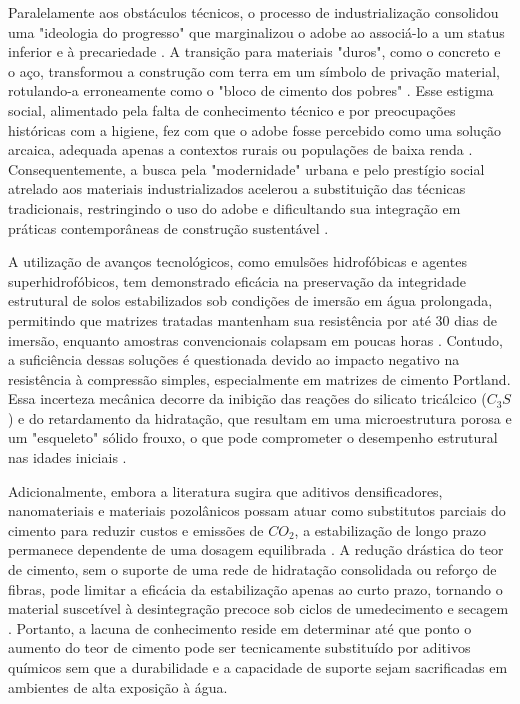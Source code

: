 Paralelamente aos obstáculos técnicos, o processo de industrialização consolidou uma "ideologia do progresso" que marginalizou o adobe ao associá-lo a um status inferior e à precariedade \cite{Aspillaga2024, Morel2021, Novato2019}. A transição para materiais "duros", como o concreto e o aço, transformou a construção com terra em um símbolo de privação material, rotulando-a erroneamente como o "bloco de cimento dos pobres" \cite{Zoungrana2021}. Esse estigma social, alimentado pela falta de conhecimento técnico e por preocupações históricas com a higiene, fez com que o adobe fosse percebido como uma solução arcaica, adequada apenas a contextos rurais ou populações de baixa renda \cite{Soler2021, Novato2019, Morel2021, Aspillaga2024}. Consequentemente, a busca pela "modernidade" urbana e pelo prestígio social atrelado aos materiais industrializados acelerou a substituição das técnicas tradicionais, restringindo o uso do adobe e dificultando sua integração em práticas contemporâneas de construção sustentável \cite{Zoungrana2021}.


A utilização de avanços tecnológicos, como emulsões hidrofóbicas e agentes superhidrofóbicos, tem demonstrado eficácia na preservação da integridade estrutural de solos estabilizados sob condições de imersão em água prolongada, permitindo que matrizes tratadas mantenham sua resistência por até 30 dias de imersão, enquanto amostras convencionais colapsam em poucas horas \cite{Guo2025}. Contudo, a suficiência dessas soluções é questionada devido ao impacto negativo na resistência à compressão simples, especialmente em matrizes de cimento Portland. Essa incerteza mecânica decorre da inibição das reações do silicato tricálcico ($C_3S$) e do retardamento da hidratação, que resultam em uma microestrutura porosa e um "esqueleto" sólido frouxo, o que pode comprometer o desempenho estrutural nas idades iniciais \cite{Lu2023, Luo2023, Jahandari2023}.

Adicionalmente, embora a literatura sugira que aditivos densificadores, nanomateriais e materiais pozolânicos possam atuar como substitutos parciais do cimento para reduzir custos e emissões de $CO_2$, a estabilização de longo prazo permanece dependente de uma dosagem equilibrada \cite{Zhang2025, Jahandari2023, Dormohamadi2024, Wahabi2021}. A redução drástica do teor de cimento, sem o suporte de uma rede de hidratação consolidada ou reforço de fibras, pode limitar a eficácia da estabilização apenas ao curto prazo, tornando o material suscetível à desintegração precoce sob ciclos de umedecimento e secagem \cite{Wahabi2021}. Portanto, a lacuna de conhecimento reside em determinar até que ponto o aumento do teor de cimento pode ser tecnicamente substituído por aditivos químicos sem que a durabilidade e a capacidade de suporte sejam sacrificadas em ambientes de alta exposição à água.

